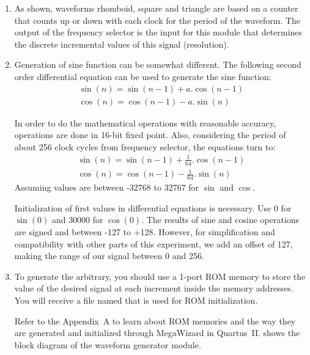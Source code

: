 \documentclass[12pt, logo=tehranDLDL/ut]{tehranDLDL}
\begin{document}
\begin{enumerate}
    \item As shown, waveforms rhomboid, square and triangle are based on a counter that counts up or down with each clock for the period of the waveform. The output of the frequency selector is the input for this module that determines the discrete incremental values of this signal (resolution).
    
    \item Generation of sine function can be somewhat different. The following second order differential equation can be used to generate the sine function:
    \begin{gather*}
    \sin(n) = \sin(n-1) + a.\cos(n-1)\\
    \cos(n) = \cos(n-1) - a.\sin(n)
    \end{gather*}
    
    In order to do the mathematical operations with reasonable accuracy, operations are done in 16-bit fixed point. Also, considering the period of about 256 clock cycles from frequency selector, the equations turn to:
    \begin{gather*}
    \sin(n) = \sin(n-1) + \frac{1}{64}.\cos(n-1)\\
    \cos(n) = \cos(n-1) - \frac{1}{64}.\sin(n)
    \end{gather*}
    Assuming values are between -32768 to 32767 for $\sin$ and $\cos$.

    Initialization of first values in differential equations is necessary. Use $0$ for $\sin(0)$ and $30000$ for $\cos(0)$.
    The results of sine and cosine operations are signed and between -127 to +128. However, for simplification and compatibility with other parts of this experiment, we add an offset of 127, making the range of our signal between 0 and 256. 

    \item To generate the arbitrary, you should use a 1-port ROM memory to store the value of the desired signal at each increment inside the memory addresses. You will receive a file named  that is used for ROM initialization. 

    Refer to the Appendix~A to learn about ROM memories and the way they are generated and initialized through MegaWizard in Quartus~II.  shows the block diagram of the waveform generator module.
\end{enumerate}
\end{document}
